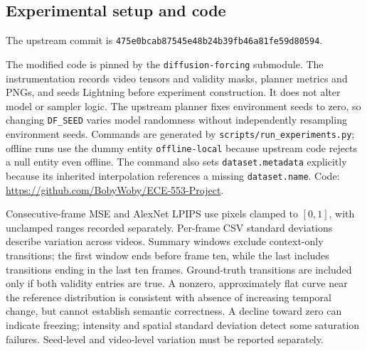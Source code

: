 \subsection{Experimental setup and code}
The upstream commit is \texttt{475e0bcab87545e48b24b39fb46a81fe59d80594}.

The modified code is pinned by the \texttt{diffusion-forcing} submodule. The instrumentation records video tensors and validity masks, planner metrics and PNGs, and seeds Lightning before experiment construction. It does not alter model or sampler logic. The upstream planner fixes environment seeds to zero, so changing \texttt{DF\_SEED} varies model randomness without independently resampling environment seeds. Commands are generated by \texttt{scripts/run\_experiments.py}; offline runs use the dummy entity \texttt{offline-local} because upstream code rejects a null entity even offline. The command also sets \texttt{dataset.metadata} explicitly because its inherited interpolation references a missing \texttt{dataset.name}. Code: \url{https://github.com/BobyWoby/ECE-553-Project}.

Consecutive-frame MSE and AlexNet LPIPS \cite{zhang2018lpips} use pixels clamped to $[0,1]$, with unclamped ranges recorded separately. Per-frame CSV standard deviations describe variation across videos. Summary windows exclude context-only transitions; the first window ends before frame ten, while the last includes transitions ending in the last ten frames. Ground-truth transitions are included only if both validity entries are true. A nonzero, approximately flat curve near the reference distribution is consistent with absence of increasing temporal change, but cannot establish semantic correctness. A decline toward zero can indicate freezing; intensity and spatial standard deviation detect some saturation failures. Seed-level and video-level variation must be reported separately.
